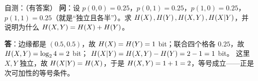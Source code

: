 \begin{qa}{自测：（有答案）}
\textbf{问}：设 $p(0,0)=0.25$，$p(0,1)=0.25$，$p(1,0)=0.25$，$p(1,1)=0.25$（就是“独立且各半”）。求 $H\!\left(X\right),H\!\left(Y\right),H\!\left(X,Y\right),H\!\left(X|Y\right)$，并说明为什么 $H\!\left(X,Y\right)=H\!\left(X\right)+H\!\left(Y\right)$。

\textbf{答}：边缘都是 $(0.5,0.5)$，故 $H\!\left(X\right)=H\!\left(Y\right)=1$ bit；联合四个格各 $0.25$，故 $H\!\left(X,Y\right)=\log_{2}4=2$ bit；
$H\!\left(X|Y\right)=H\!\left(X,Y\right)-H\!\left(Y\right)=2-1=1$ bit。
这里 $X,Y$ 独立，故 $H\!\left(X|Y\right)=H\!\left(X\right)$，于是 $H\!\left(X,Y\right)=1+1=2$，等号成立——正是次可加性的等号条件。
\end{qa}
